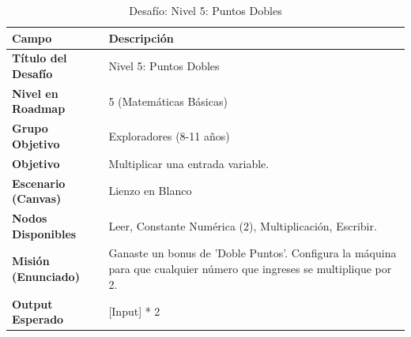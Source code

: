 \begin{table}[H]
    \centering
    \caption{Desafío: Nivel 5: Puntos Dobles}
    \label{tab:desafio-exp-5}
    \begingroup
    \renewcommand{\arraystretch}{\TableRowStretch}
    \begin{tabularx}{\textwidth}{ l X }
        \hline
        \textbf{Campo}              & \textbf{Descripción}                                                                                                  \\
        \hline
        \textbf{Título del Desafío} & Nivel 5: Puntos Dobles                                                                                                \\
        \textbf{Nivel en Roadmap}   & 5 (Matemáticas Básicas)                                                                                               \\
        \textbf{Grupo Objetivo}     & Exploradores (8-11 años)                                                                                              \\
        \textbf{Objetivo}           & Multiplicar una entrada variable.                                                                                     \\
        \textbf{Escenario (Canvas)} & Lienzo en Blanco                                                                                                      \\
        \textbf{Nodos Disponibles}  & Leer, Constante Numérica (2), Multiplicación, Escribir.                                                               \\
        \textbf{Misión (Enunciado)} & Ganaste un bonus de 'Doble Puntos'. Configura la máquina para que cualquier número que ingreses se multiplique por 2. \\
        \textbf{Output Esperado}    & [Input] * 2                                                                                                           \\
        \hline
    \end{tabularx}
    \endgroup
\end{table}

